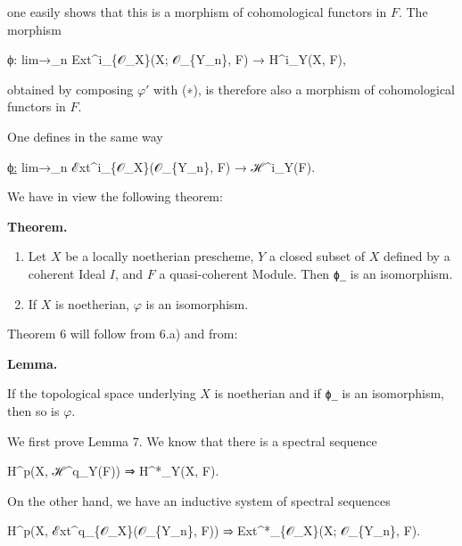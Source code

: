 \documentclass[
  11pt,
  a4paper,
]{book}
\newenvironment{Shaded}{}{}
\newcommand{\NormalTok}[1]{#1}
\begin{document}
one easily shows that this is a morphism of cohomological functors in
\(F\). The morphism

\begin{Shaded}
\begin{Highlighting}[]
\NormalTok{ϕ: lim→\_n Ext\^{}i\_\{𝒪\_X\}(X; 𝒪\_\{Y\_n\}, F) → H\^{}i\_Y(X, F),}
\end{Highlighting}
\end{Shaded}

obtained by composing \(\varphi'\) with (∗), is therefore also a
morphism of cohomological functors in \(F\).

One defines in the same way

\begin{Shaded}
\begin{Highlighting}[]
\NormalTok{ϕ̲: lim→\_n ℰxt\^{}i\_\{𝒪\_X\}(𝒪\_\{Y\_n\}, F) → ℋ\^{}i\_Y(F).}
\end{Highlighting}
\end{Shaded}

We have in view the following theorem:

\textbf{Theorem.}

\begin{enumerate}
\def\labelenumi{\alph{enumi})}
\item
  Let \(X\) be a locally noetherian prescheme, \(Y\) a closed subset of
  \(X\) defined by a coherent Ideal \(I\), and \(F\) a quasi-coherent
  Module. Then \texttt{ϕ̲} is an isomorphism.
\item
  If \(X\) is noetherian, \(\varphi\) is an isomorphism.
\end{enumerate}

Theorem 6 will follow from 6.a) and from:

\textbf{Lemma.}

If the topological space underlying \(X\) is noetherian and if
\texttt{ϕ̲} is an isomorphism, then so is \(\varphi\).

We first prove Lemma 7. We know that there is a spectral sequence

\begin{Shaded}
\begin{Highlighting}[]
\NormalTok{H\^{}p(X, ℋ\^{}q\_Y(F)) ⇒ H\^{}*\_Y(X, F).}
\end{Highlighting}
\end{Shaded}

On the other hand, we have an inductive system of spectral sequences

\begin{Shaded}
\begin{Highlighting}[]
\NormalTok{H\^{}p(X, ℰxt\^{}q\_\{𝒪\_X\}(𝒪\_\{Y\_n\}, F)) ⇒ Ext\^{}*\_\{𝒪\_X\}(X; 𝒪\_\{Y\_n\}, F).}
\end{Highlighting}
\end{Shaded}
\end{document}
